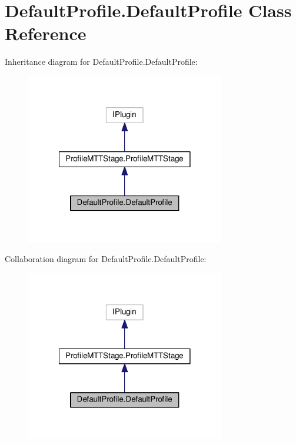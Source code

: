 \hypertarget{class_default_profile_1_1_default_profile}{\section{Default\-Profile.\-Default\-Profile Class Reference}
\label{class_default_profile_1_1_default_profile}
}


Inheritance diagram for Default\-Profile.\-Default\-Profile\-:
\nopagebreak
\begin{figure}[H]
\begin{center}
\leavevmode
\includegraphics[width=246pt]{class_default_profile_1_1_default_profile__inherit__graph}
\end{center}
\end{figure}


Collaboration diagram for Default\-Profile.\-Default\-Profile\-:
\nopagebreak
\begin{figure}[H]
\begin{center}
\leavevmode
\includegraphics[width=246pt]{class_default_profile_1_1_default_profile__coll__graph}
\end{center}
\end{figure}
